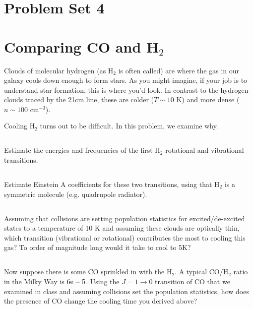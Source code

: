 \documentclass[11pt]{article}
\def\e{{\rm e}}
\begin{document}
\pagestyle{empty}
\parindent=0pt

\section*{\centering Problem Set 4}

\section{Comparing CO and H$_2$}

Clouds of molecular hydrogen (as H$_2$ is often called) are where the gas
in our galaxy cools down enough to form stars.  As you might imagine, if your
job is to understand star formation, this is where you'd look.  In contrast
to the hydrogen clouds traced by the 21cm line, these are colder ($T\sim 10$ K)
and more dense ($n\sim100$ cm$^{-3}$).

Cooling H$_2$ turns out to be difficult.  In this problem, we examine why.

\subsection{}
\vspace{-8pt}
Estimate the energies and frequencies of the first H$_2$ rotational and vibrational transitions.

\subsection{}
\vspace{-8pt}
Estimate Einstein A coefficients for these two transitions, using that H$_2$ is a symmetric molecule
(e.g. quadrupole radiator).

\subsection{}
\vspace{-8pt}
Assuming that collisions are setting population statistics for excited/de-excited states to a temperature
of 10 K and assuming these clouds are optically thin, which transition (vibrational or rotational) contributes
the most to cooling this gas?  To order of magnitude long would it take to cool to 5K?

\subsection{}
\vspace{-8pt}
Now suppose there is some CO sprinkled in with the H$_2$.  A typical CO/H$_2$ ratio in the Milky Way
is $6\e-5$.  Using the $J=1\rightarrow0$ transition of CO that we examined in class and assuming
collisions set the population statistics, how does the presence of CO change the cooling time you
derived above?
\end{document}
